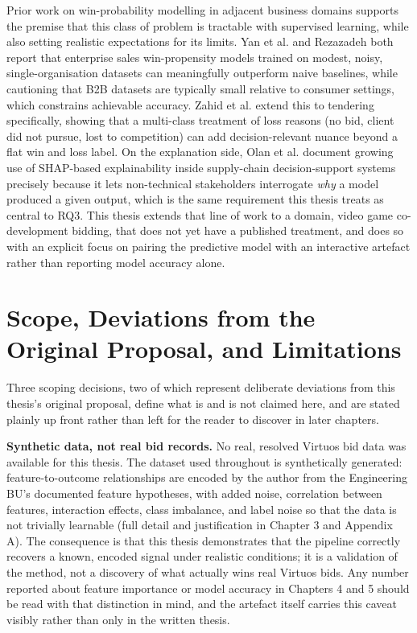 Prior work on win-probability modelling in adjacent business domains
supports the premise that this class of problem is tractable with
supervised learning, while also setting realistic expectations for its
limits. Yan et al. \citep{yan2015sales} and Rezazadeh
\citep{rezazadeh2020generalized} both report that enterprise sales
win-propensity models trained on modest, noisy, single-organisation
datasets can meaningfully outperform naive baselines, while cautioning
that B2B datasets are typically small relative to consumer settings,
which constrains achievable accuracy. Zahid et al.
\citep{zahid2021predicting} extend this to tendering specifically,
showing that a multi-class treatment of loss reasons (no bid, client did
not pursue, lost to competition) can add decision-relevant nuance beyond
a flat win and loss label. On the explanation side, Olan et al.
\citep{olan2024enabling} document growing use of SHAP-based
explainability inside supply-chain decision-support systems precisely
because it lets non-technical stakeholders interrogate \emph{why} a
model produced a given output, which is the same requirement this thesis
treats as central to RQ3. This thesis extends that line of work to a
domain, video game co-development bidding, that does not yet have a
published treatment, and does so with an explicit focus on pairing the
predictive model with an interactive artefact rather than reporting
model accuracy alone.

\hypertarget{scope-deviations-from-the-original-proposal-and-limitations}{%
\section{Scope, Deviations from the Original Proposal, and
Limitations}\label{scope-deviations-from-the-original-proposal-and-limitations}}

Three scoping decisions, two of which represent deliberate deviations
from this thesis's original proposal, define what is and is not claimed
here, and are stated plainly up front rather than left for the reader to
discover in later chapters.

\textbf{Synthetic data, not real bid records.} No real, resolved Virtuos
bid data was available for this thesis. The dataset used throughout is
synthetically generated: feature-to-outcome relationships are encoded by
the author from the Engineering BU's documented feature hypotheses, with
added noise, correlation between features, interaction effects, class
imbalance, and label noise so that the data is not trivially learnable
(full detail and justification in Chapter 3 and Appendix A). The
consequence is that this thesis demonstrates that the pipeline correctly
recovers a known, encoded signal under realistic conditions; it is a
validation of the method, not a discovery of what actually wins real
Virtuos bids. Any number reported about feature importance or model
accuracy in Chapters 4 and 5 should be read with that distinction in
mind, and the artefact itself carries this caveat visibly rather than
only in the written thesis.

